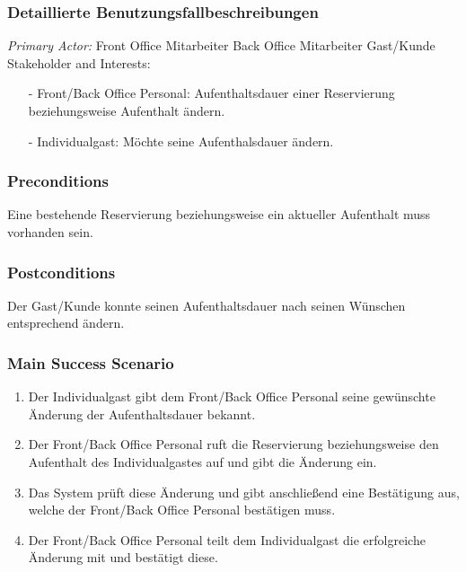 \documentclass[./detailed_overview_usecases.tex]{subfiles}
\begin{document}
    \subsubsection{Detaillierte Benutzungsfallbeschreibungen}
    \textit{Primary Actor:}
    Front Office Mitarbeiter
	Back Office Mitarbeiter
	Gast/Kunde
    \\
    Stakeholder and Interests:
    \begin{itemize}
        \item[-] Front/Back Office Personal: Aufenthaltsdauer einer Reservierung beziehungsweise Aufenthalt ändern.
        \item[-] Individualgast: Möchte seine Aufenthalsdauer ändern.
    \end{itemize}

    \subsubsection*{Preconditions}
	Eine bestehende Reservierung beziehungsweise ein aktueller Aufenthalt muss vorhanden sein.
	
    \subsubsection*{Postconditions}
    Der Gast/Kunde konnte seinen Aufenthaltsdauer nach seinen Wünschen entsprechend ändern.
	
    \subsubsection*{Main Success Scenario}
    \begin{enumerate}
        \item Der Individualgast gibt dem Front/Back Office Personal seine gewünschte Änderung der Aufenthaltsdauer bekannt.
        \item Der Front/Back Office Personal ruft die Reservierung beziehungsweise den Aufenthalt des Individualgastes auf und gibt die Änderung ein.
	    \item Das System prüft diese Änderung und gibt anschließend eine Bestätigung aus, welche der Front/Back Office Personal bestätigen muss.
	    \item Der Front/Back Office Personal teilt dem Individualgast die erfolgreiche Änderung mit und bestätigt diese.
    \end{enumerate}
\end{document}
